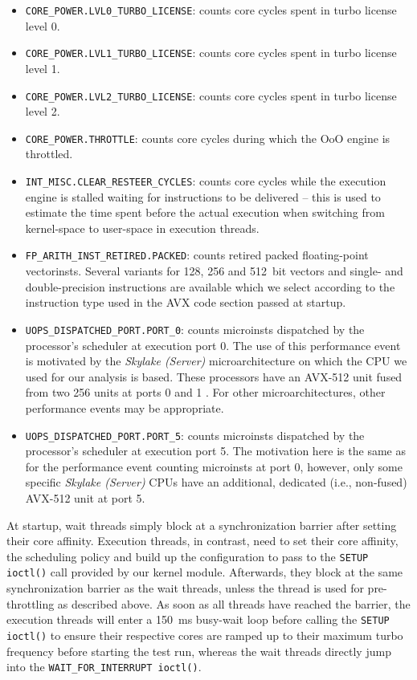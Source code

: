 \begin{itemize}
	\item \texttt{CORE\_POWER.LVL0\_TURBO\_LICENSE}: counts core cycles spent in turbo license level 0.
	\item \texttt{CORE\_POWER.LVL1\_TURBO\_LICENSE}: counts core cycles spent in turbo license level 1.
	\item \texttt{CORE\_POWER.LVL2\_TURBO\_LICENSE}: counts core cycles spent in turbo license level 2.
	\item \texttt{CORE\_POWER.THROTTLE}: counts core cycles during which the \gls{OoO} engine is throttled.
	\item \texttt{INT\_MISC.CLEAR\_RESTEER\_CYCLES}: counts core cycles while the execution engine is stalled waiting for instructions to be delivered -- this is used to estimate the time spent before the actual execution when switching from kernel-space to user-space in execution threads.
	\item \texttt{FP\_ARITH\_INST\_RETIRED.PACKED}: counts retired packed floating-point \glspl{vectorinst}. Several variants for \SI{128}{\bit}, \SI{256}{\bit} and \SI{512}{bit} vectors and single- and double-precision instructions are available which we select according to the instruction type used in the \gls{AVX} code section passed at startup.
	\item \texttt{UOPS\_DISPATCHED\_PORT.PORT\_0}: counts \glspl{microinst} dispatched by the processor's scheduler at execution port 0. The use of this performance event is motivated by the \textit{Skylake (Server)} microarchitecture on which the \gls{CPU} we used for our analysis is based. These processors have an \gls{AVX-512} unit fused from two \SI{256}{\bit} units at ports 0 and 1 \cite{intelxeonscalabledeepdive}. For other microarchitectures, other performance events may be appropriate.
	\item \texttt{UOPS\_DISPATCHED\_PORT.PORT\_5}: counts \glspl{microinst} dispatched by the processor's scheduler at execution port 5. The motivation here is the same as for the performance event counting \glspl{microinst} at port 0, however, only some specific \textit{Skylake (Server)} \glspl{CPU} have an additional, dedicated (i.e., non-fused) \gls{AVX-512} unit at port 5.
\end{itemize}

At startup, wait threads simply block at a synchronization barrier after setting their core affinity. Execution threads, in contrast, need to set their core affinity, the scheduling policy and build up the configuration to pass to the \texttt{SETUP ioctl()} call provided by our kernel module. Afterwards, they block at the same synchronization barrier as the wait threads, unless the thread is used for pre-throttling as described above. As soon as all threads have reached the barrier, the execution threads will enter a \SI{150}{\milli\second} busy-wait loop before calling the \texttt{SETUP ioctl()} to ensure their respective cores are ramped up to their maximum turbo frequency before starting the test run, whereas the wait threads directly jump into the \texttt{WAIT\_FOR\_INTERRUPT ioctl()}.

